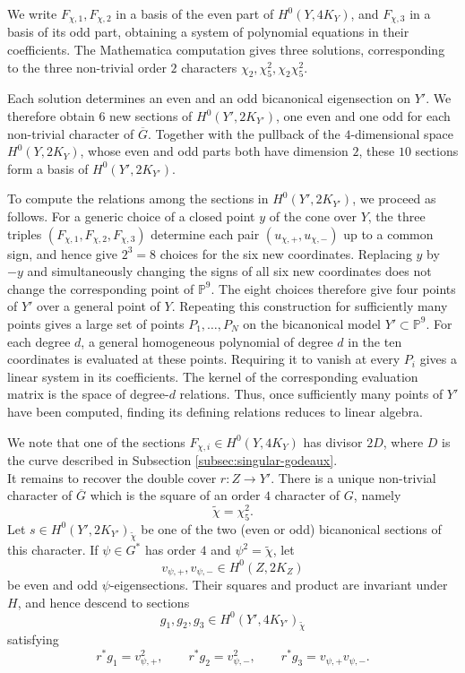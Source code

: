 \documentclass[11pt,a4paper]{article}
\begin{document}
We write \(F_{\chi,1},F_{\chi,2}\) in a basis of the even part of
\(H^0(Y,4K_Y)\), and \(F_{\chi,3}\) in a basis of its odd part, obtaining a
system of polynomial equations in their coefficients.
The Mathematica \cite{Mathematica} computation gives three solutions,
corresponding to the three non-trivial order $2$ characters
$\chi _2, \chi _5^2, \chi _2\chi _5^2$.

Each solution determines an even and an odd bicanonical eigensection on
\(Y'\).  We therefore obtain $6$ new sections of \(H^0(Y',2K_{Y'})\),
one even and one odd for each non-trivial character of \(\overline G\).
Together with the pullback of the $4$-dimensional space
\(H^0(Y,2K_Y)\), whose even and odd parts both have dimension $2$, these
$10$ sections form a basis of
\(H^0(Y',2K_{Y'})\).

To compute the relations among the sections in \(H^0(Y',2K_{Y'})\), we proceed as follows.
For a generic choice of a closed point \(y\) of the cone over \(Y\), the three triples
\((F_{\chi,1},F_{\chi,2},F_{\chi,3})\) determine each pair
\((u_{\chi,+},u_{\chi,-})\) up to a common sign, and hence give
\(2^3=8\) choices for the six new coordinates.  Replacing \(y\) by
\(-y\) and simultaneously changing the signs of all six new coordinates
does not change the corresponding point of \(\mathbb P^9\).  The eight
choices therefore give four points of \(Y'\) over a general point of \(Y\).
Repeating this construction for sufficiently many points gives a large
set of points \(P_1,\ldots,P_N\) on the bicanonical model
\(Y'\subset\mathbb P^9\). For each degree \(d\), a general homogeneous
polynomial of degree \(d\) in the ten coordinates is evaluated at these
points. Requiring it to vanish at every \(P_i\) gives a linear system in
its coefficients. The kernel of the corresponding evaluation matrix is
the space of degree-\(d\) relations. Thus, once sufficiently many points
of \(Y'\) have been computed, finding its defining relations reduces to linear algebra.

We note that one of the sections \(F_{\chi,i}\in H^0(Y,4K_Y)\) has divisor \(2D\), where
$D$ is the curve described in Subsection \ref{subsec:singular-godeaux}.\\

\newline
It remains to recover the double cover \(r\colon Z\to Y'\).  There is a
unique non-trivial character of \(\overline G\) which is the square of an
order $4$ character of \(G\), namely
\[
        \tilde\chi=\chi _5^2.
\]
Let \(s\in H^0(Y',2K_{Y'})_{\tilde\chi}\) be one of the two (even or odd) bicanonical
sections of this character.  If \(\psi\in G^*\) has order $4$ and
\(\psi^2=\tilde\chi\), let
\[
        v_{\psi,+},v_{\psi,-}\in H^0(Z,2K_Z)
\]
be even and odd \(\psi\)-eigensections.  Their squares and product are
invariant under \(H\), and hence descend to sections
\[
        g_1,g_2,g_3\in H^0(Y',4K_{Y'})_{\tilde\chi}
\]
satisfying
\[
 r^*g_1=v_{\psi,+}^2,\qquad
 r^*g_2=v_{\psi,-}^2,\qquad
 r^*g_3=v_{\psi,+}v_{\psi,-}.
\]
\end{document}
